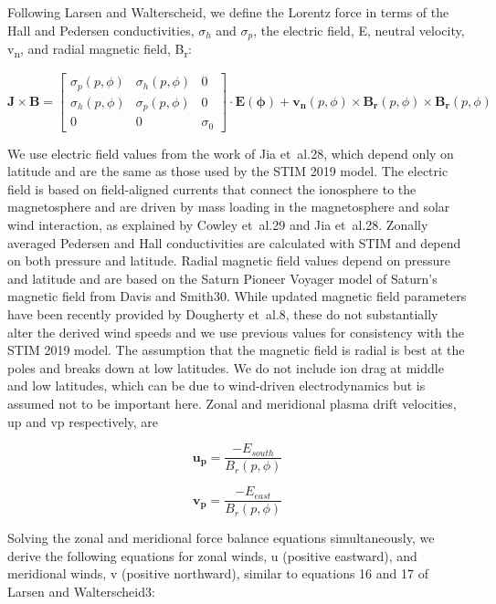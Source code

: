 Following Larsen and Walterscheid, we define the Lorentz force in terms of the Hall and Pedersen conductivities, $\sigma_h$ and $\sigma_p$, the electric field, E, neutral velocity, v\textsubscript{n}, and radial magnetic field, B\textsubscript{r}:

\begin{equation}
    \mathbf{J} \times \mathbf{B} = \begin{bmatrix}
    \sigma_p(p,\phi) & \sigma_h(p,\phi) & 0\\
    \sigma_h(p,\phi) & \sigma_p(p,\phi) & 0\\
    0 & 0 & \sigma_0
    \end{bmatrix}
    \cdot \mathbf{E(\phi)} + \mathbf{v_n}(p,\phi) \times \mathbf{B_r}(p,\phi) \times \mathbf{B_r}(p,\phi)
\end{equation}

We use electric field values from the work of Jia et al.28, which depend only on latitude and are the same as those used by the STIM 2019 model. The electric field is based on field-aligned currents that connect the ionosphere to the magnetosphere and are driven by mass loading in the magnetosphere and solar wind interaction, as explained by Cowley et al.29 and Jia et al.28. Zonally averaged Pedersen and Hall conductivities are calculated with STIM and depend on both pressure and latitude. Radial magnetic field values depend on pressure and latitude and are based on the Saturn Pioneer Voyager model of Saturn’s magnetic field from Davis and Smith30. While updated magnetic field parameters have been recently provided by Dougherty et al.8, these do not substantially alter the derived wind speeds and we use previous values for consistency with the STIM 2019 model. The assumption that the magnetic field is radial is best at the poles and breaks down at low latitudes. We do not include ion drag at middle and low latitudes, which can be due to wind-driven electrodynamics but is assumed not to be important here. Zonal and meridional plasma drift velocities, up and vp respectively, are

\begin{equation}
	\mathbf{u_p} = \frac{-E_{south}}{B_r(p,\phi)}
\end{equation}

\begin{equation}
	\mathbf{v_p} = \frac{-E_{east}}{B_r(p,\phi)}
\end{equation}

Solving the zonal and meridional force balance equations simultaneously, we derive the following equations for zonal winds, u (positive eastward), and meridional winds, v (positive northward), similar to equations 16 and 17 of Larsen and Walterscheid3:


